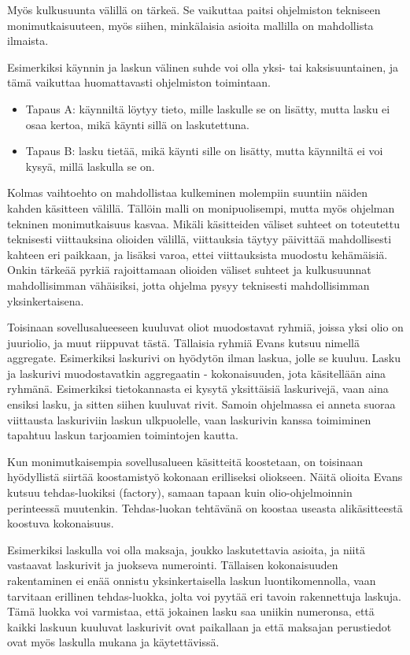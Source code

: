 Myös \gls{kulkusuunta}  välillä on
tärkeä. Se vaikuttaa paitsi ohjelmiston tekniseen monimutkaisuuteen,
myös siihen, minkälaisia asioita mallilla on mahdollista ilmaista.

Esimerkiksi käynnin ja laskun välinen suhde voi olla yksi- tai
kaksisuuntainen, ja tämä vaikuttaa huomattavasti ohjelmiston toimintaan.

\begin{itemize}
\tightlist
\item
  Tapaus A: käynniltä löytyy tieto, mille laskulle se on lisätty, mutta
  lasku ei osaa kertoa, mikä käynti sillä on laskutettuna.
\item
  Tapaus B: lasku tietää, mikä käynti sille on lisätty, mutta käynniltä
  ei voi kysyä, millä laskulla se on.
\end{itemize}

Kolmas vaihtoehto on mahdollistaa kulkeminen molempiin suuntiin näiden
kahden käsitteen välillä. Tällöin malli on monipuolisempi, mutta myös
ohjelman tekninen monimutkaisuus kasvaa. Mikäli käsitteiden väliset
suhteet on toteutettu teknisesti viittauksina olioiden välillä,
viittauksia täytyy päivittää mahdollisesti kahteen eri paikkaan, ja
lisäksi varoa, ettei viittauksista muodostu kehämäisiä. Onkin tärkeää
pyrkiä rajoittamaan olioiden väliset suhteet ja kulkusuunnat
mahdollisimman vähäisiksi, jotta ohjelma pysyy teknisesti mahdollisimman
yksinkertaisena.

Toisinaan sovellusalueeseen kuuluvat oliot muodostavat ryhmiä, joissa
yksi olio on juuriolio, ja muut riippuvat tästä. Tällaisia ryhmiä Evans
kutsuu nimellä \gls{aggregate}. Esimerkiksi laskurivi on hyödytön ilman
laskua, jolle se kuuluu. Lasku ja laskurivi muodostavatkin aggregaatin -
kokonaisuuden, jota käsitellään aina ryhmänä. Esimerkiksi tietokannasta
ei kysytä yksittäisiä laskurivejä, vaan aina ensiksi lasku, ja sitten
siihen kuuluvat rivit. Samoin ohjelmassa ei anneta suoraa viittausta
laskuriviin laskun ulkpuolelle, vaan laskurivin kanssa toimiminen
tapahtuu laskun tarjoamien toimintojen kautta.

Kun monimutkaisempia sovellusalueen käsitteitä koostetaan, on toisinaan
hyödyllistä siirtää koostamistyö kokonaan erilliseksi oliokseen. Näitä
olioita Evans kutsuu tehdas-luokiksi (factory), samaan tapaan kuin
olio-ohjelmoinnin perinteessä muutenkin. Tehdas-luokan tehtävänä on
koostaa useasta alikäsitteestä koostuva kokonaisuus.

Esimerkiksi laskulla voi olla maksaja, joukko laskutettavia asioita, ja
niitä vastaavat laskurivit ja juokseva numerointi. Tällaisen
kokonaisuuden rakentaminen ei enää onnistu yksinkertaisella laskun
luontikomennolla, vaan tarvitaan erillinen tehdas-luokka, jolta voi
pyytää eri tavoin rakennettuja laskuja. Tämä luokka voi varmistaa, että
jokainen lasku saa uniikin numeronsa, että kaikki laskuun kuuluvat
laskurivit ovat paikallaan ja että maksajan perustiedot ovat myös
laskulla mukana ja käytettävissä.


